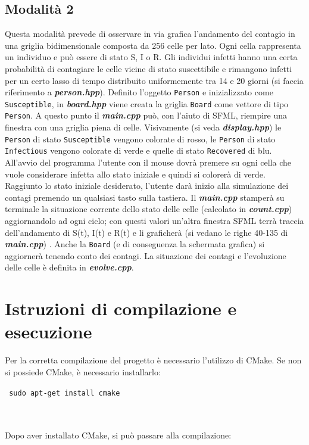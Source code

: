 \documentclass[a4paper,10 pt]{article}
\begin{document}
\subsection{Modalità 2}
Questa modalità prevede di osservare in via grafica l'andamento del contagio in una griglia bidimensionale composta da 256 celle per lato. Ogni cella rappresenta un individuo e può essere di stato S, I o R. Gli individui infetti hanno una certa probabilità di contagiare le celle vicine di stato suscettibile e rimangono infetti per un certo lasso di tempo distribuito uniformemente tra 14 e 20 giorni (si faccia riferimento a \textbf{\textit{person.hpp}}). Definito l'oggetto \verb!Person! e inizializzato come \verb!Susceptible!, in \textbf{\textit{board.hpp}} viene creata la griglia \verb!Board! come vettore di tipo  \verb!Person!. A questo punto il \textbf{\textit{main.cpp}} può, con l'aiuto di SFML, riempire una finestra con una griglia piena di celle. Visivamente (si veda  \textbf{\textit{display.hpp}}) le \verb!Person! di stato \verb!Susceptible! vengono colorate di rosso, le \verb!Person! di stato \verb!Infectious! vengono colorate di verde e quelle di stato \verb!Recovered! di blu.
\ \\
All'avvio del programma l'utente con il mouse dovrà premere su ogni cella che vuole considerare infetta allo stato iniziale e quindi si colorerà di verde. Raggiunto lo stato iniziale desiderato, l'utente darà inizio alla simulazione dei contagi premendo un qualsiasi tasto sulla tastiera. Il \textbf{\textit{main.cpp}} stamperà su terminale la situazione corrente dello stato delle celle (calcolato in \textbf{\textit{count.cpp}}) aggiornandolo ad ogni ciclo; con questi valori un'altra finestra SFML terrà traccia dell'andamento di S(t), I(t) e R(t) e li graficherà (si vedano le righe 40-135 di \textbf{\textit{main.cpp}}) . Anche la \verb!Board! (e di conseguenza la schermata grafica) si aggiornerà tenendo conto dei contagi. La situazione dei contagi e l'evoluzione delle celle è definita in \textbf{\textit{evolve.cpp}}.

\section{Istruzioni di compilazione e esecuzione}

Per la corretta compilazione del progetto è necessario l'utilizzo di CMake. %
Se non si possiede CMake, è necessario installarlo:
\begin {quoting}
 \verb! sudo apt-get install cmake !
\end{quoting}
\ \\
\ \\
Dopo aver installato CMake, si può passare alla compilazione:
\end{document}
